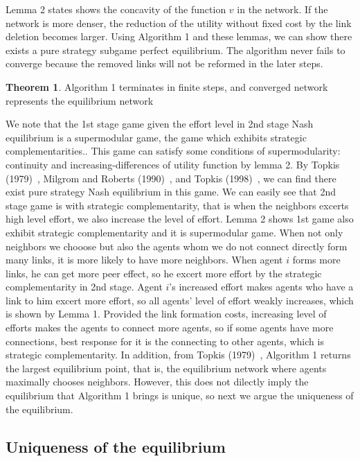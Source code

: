 \documentclass[12pt]{article}
\theoremstyle{definition}
\newtheorem{theorem}{Theorem}
\begin{document}
Lemma 2 states shows the concavity of the function $v$ in the network.
If the network is more denser, the reduction of the utility without fixed cost by the link deletion becomes larger.
Using Algorithm 1 and these lemmas, we can show there exists a pure strategy subgame perfect equilibrium.
The algorithm never fails to converge because the removed links will not be reformed in the later steps.

\begin{theorem}
Algorithm 1 terminates in finite steps, and converged network represents the equilibrium network
\end{theorem}

We note that the 1st stage game given the effort level in 2nd stage Nash equilibrium is a supermodular game, the game which exhibits strategic complementarities..
This game can satisfy some conditions of supermodularity: continuity and increasing-differences of utility function by lemma 2.
By Topkis (1979)~\cite{topkis1979}, Milgrom and Roberts (1990)~\cite{milgromroberts}, and Topkis (1998)~\cite{topkis1998}, we can find there exist pure strategy Nash equilibrium in this game.
We can easily see that 2nd stage game is with strategic complementarity, that is when the neighbors excerts high level effort, we also increase the level of effort.
Lemma 2 shows 1st game also exhibit strategic complementarity and it is supermodular game.
When not only neighbors we chooose but also the agents whom we do not connect directly form many links, it is more likely to have more neighbors.
When agent $i$ forms more links, he can get more peer effect, so he excert more effort by the strategic complementarity in 2nd stage.
Agent $i$'s increased effort makes agents who have a link to him excert more effort, so all agents' level of effort weakly increases, which is shown by Lemma 1.
Provided the link formation costs, increasing level of efforts makes the agents to connect more agents, so if some agents have more connections, best response for it is the connecting to other agents, which is strategic complementarity.
In addition, from Topkis (1979)~\cite{topkis1979}, Algorithm 1 returns the largest equilibrium point, that is, the equilibrium network where agents maximally chooses neighbors.
However, this does not dilectly imply the equilibrium that Algorithm 1 brings is unique, so next we argue the uniqueness of the equilibrium.


\subsection{Uniqueness of the equilibrium}
\end{document}
